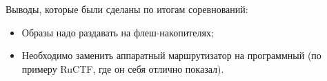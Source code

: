 Выводы, которые были сделаны по итогам соревнований:

\begin{itemize}
\item Образы надо раздавать на флеш-накопителях;
\item Необходимо заменить аппаратный маршрутизатор на программный (по примеру RuCTF, где он себя отлично показал).
\end{itemize}

